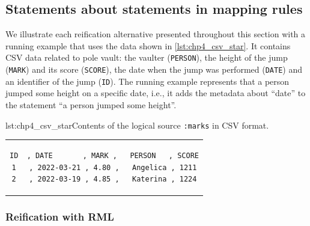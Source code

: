 
\subsection{Statements about statements in mapping rules}
\label{sec:chp4_reif_mappings}


We illustrate each reification alternative presented throughout this section with a running example that uses the data shown in \cref{lst:chp4_csv_star}.
It contains CSV data related to pole vault:
the vaulter (\texttt{PERSON}),
the height of the jump (\texttt{MARK}) and its score (\texttt{SCORE}),
the date when the jump was performed (\texttt{DATE}) and
an identifier of the jump (\texttt{ID}).
The running example represents
that a person jumped some height on a specific date, i.e., it adds the metadata about ``date''
to the statement ``a person jumped some height''.

\noindent\hspace{0.15\linewidth}\begin{minipage}{\linewidth}
\begin{captionedlisting}{lst:chp4_csv_star}{Contents of the logical source \texttt{:marks} in CSV format.}
\centering
\begin{tabular}{c}
\hspace{3em}
{\begin{lstlisting}[basicstyle=\ttfamily\small,label={list:example1},columns=flexible]
ID  , DATE       , MARK ,   PERSON   , SCORE
1   , 2022-03-21 , 4.80 ,   Angelica , 1211
2   , 2022-03-19 , 4.85 ,   Katerina , 1224
\end{lstlisting}}
\end{tabular}
\end{captionedlisting}
\end{minipage}

\subsubsection{Reification with RML}

